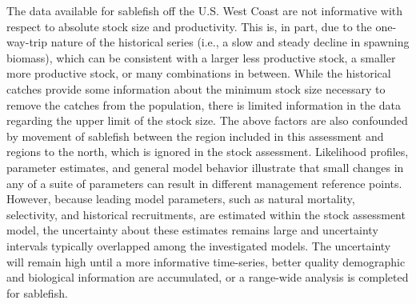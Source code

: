 \documentclass[11pt,
  english,
  a4paper,
]{article}
\begin{document}
\leavevmode\tagmcend\tagstructend


The data available for sablefish off the U.S. West Coast are not informative with respect to absolute stock size and productivity. This is, in part, due to the one-way-trip nature of the historical series (i.e., a slow and steady decline in spawning biomass), which can be consistent with a larger less productive stock, a smaller more productive stock, or many combinations in between. While the historical catches provide some information about the minimum stock size necessary to remove the catches from the population, there is limited information in the data regarding the upper limit of the stock size. The above factors are also confounded by movement of sablefish between the region included in this assessment and regions to the north, which is ignored in the stock assessment. Likelihood profiles, parameter estimates, and general model behavior illustrate that small changes in any of a suite of parameters can result in different management reference points. However, because leading model parameters, such as natural mortality, selectivity, and historical recruitments, are estimated within the stock assessment model, the uncertainty about these estimates remains large and uncertainty intervals typically overlapped among the investigated models. The uncertainty will remain high until a more informative time-series, better quality demographic and biological information are accumulated, or a range-wide analysis is completed for sablefish.

\leavevmode\tagmcend\tagstructend\par

\end{document}
